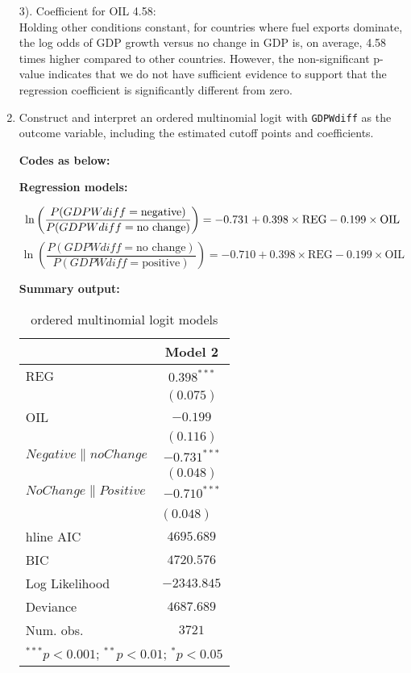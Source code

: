 \documentclass[12pt,a4paper]{article}
\begin{document}
\begin{enumerate}
3). Coefficient for OIL 4.58: 
\\Holding other conditions constant, for countries where fuel exports dominate, the log odds of GDP growth versus no change in GDP is, on average, 4.58 times higher compared to other countries. However, the non-significant p-value indicates that we do not have sufficient evidence to support that the regression coefficient is significantly different from zero.  
  

	\item Construct and interpret an ordered multinomial logit with \texttt{GDPWdiff} as the outcome variable, including the estimated cutoff points and coefficients.
	
		\noindent \textbf{Codes as below:}

	
		\noindent \textbf{Regression models:}

			\[
			\ln\left(\frac{{P(GDPWdiff = \text{negative})}}{{P(GDPWdiff = \text{no change})}}\right)= -0.731 + 0.398  \times \text{REG} - 0.199 \times \text{OIL} \\
			\]
			\[
			\ln\left(\frac{{P(GDPWdiff = \text{no change})}}{{P(GDPWdiff = \text{positive})}}\right)= -0.710 + 0.398  \times \text{REG} - 0.199 \times \text{OIL}
			\]

	
	\newpage
\noindent \textbf{Summary output:}

\begin{table}[h] 
	\begin{center}
		\begin{tabular}{l c}\hline & Model 2\\\hline REG                & $0.398^{***}$  \\                   & $(0.075)$      
			\\OIL                & $-0.199$       \\                   & $(0.116)$     
			\\$Negative\|no Change$ & $-0.731^{***}$ \\                   & $(0.048)$      
			\\$No Change\|Positive$ & $-0.710^{***}$ \\                   & $(0.048)$      \
			\\hline AIC                & $4695.689$     \\BIC                & $4720.576$     
			\\Log Likelihood     & $-2343.845$    \\Deviance           & $4687.689$     
			\\Num. obs.          & $3721$         \\\hline\multicolumn{2}{l}{\scriptsize{$^{***}p<0.001$; $^{**}p<0.01$; $^{*}p<0.05$}}
		\end{tabular}\caption{ordered multinomial logit  models}\label{table:coefficients}
	\end{center}
\end{table}


\end{enumerate}
\end{document}
